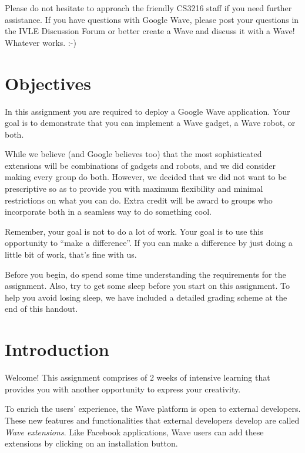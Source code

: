 Please do not hesitate to approach the friendly CS3216 staff if you
need further assistance. If you have questions with Google Wave,
please post your questions in the IVLE Discussion Forum or better
create a Wave and discuss it with a Wave! Whatever works. :-)

\section{Objectives}

In this assignment you are required to deploy a Google Wave
application.  Your goal is to demonstrate that you can implement a
Wave gadget, a Wave robot, or both.

While we believe (and Google believes too) that the most sophisticated
extensions will be combinations of gadgets and robots, and we did
consider making every group do both. However, we decided that we did
not want to be prescriptive so as to provide you with maximum
flexibility and minimal restrictions on what you can do. Extra credit
will be award to groups who incorporate both in a seamless way to do
something cool.

Remember, your goal is not to do a lot of work. Your goal is to use
this opportunity to ``make a difference''. If you can make a
difference by just doing a little bit of work, that's fine with us.

Before you begin, do spend some time understanding the requirements
for the assignment. Also, try to get some sleep before you start on
this assignment. To help you avoid losing sleep, we have included a
detailed grading scheme at the end of this handout.

\section{Introduction}

Welcome! This assignment comprises of 2 weeks of intensive learning
that provides you with another opportunity to express your creativity.

To enrich the users' experience, the Wave platform is open to external
developers. These new features and functionalities that external
developers develop are called {\em Wave extensions}. Like Facebook
applications, Wave users can add these extensions by clicking on an
installation button.

